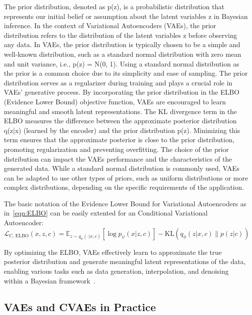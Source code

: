 The prior distribution, denoted as p(z), is a probabilistic distribution that represents our initial belief or assumption about the latent variables z in Bayesian inference. In the context of Variational Autoencoders (VAEs), the prior distribution refers to the distribution of the latent variables z before observing any data.
In VAEs, the prior distribution is typically chosen to be a simple and well-known distribution, such as a standard normal distribution with zero mean and unit variance, i.e., p(z) = N(0, 1). Using a standard normal distribution as the prior is a common choice due to its simplicity and ease of sampling.
The prior distribution serves as a regularizer during training and plays a crucial role in VAEs' generative process. By incorporating the prior distribution in the ELBO (Evidence Lower Bound) objective function, VAEs are encouraged to learn meaningful and smooth latent representations. The KL divergence term in the ELBO measures the difference between the approximate posterior distribution q(z|x) (learned by the encoder) and the prior distribution p(z). Minimizing this term ensures that the approximate posterior is close to the prior distribution, promoting regularization and preventing overfitting.
The choice of the prior distribution can impact the VAEs performance and the characteristics of the generated data. While a standard normal distribution is commonly used, VAEs can be adapted to use other types of priors, such as uniform distributions or more complex distributions, depending on the specific requirements of the application.
\fi

The basic notation of the Evidence Lower Bound for Variational Autoencoders as in~\eqref{eqn:ELBO} can be easily extented for an Conditional Variational Autoencoder:
\begin{equation}\label{eqn:ELBO-CVAE}
	\mathcal{L}_\text{C, ELBO}(x, z, c) = \mathbb{E}_{z\sim q_\phi(\cdot|x, c)} \left[ \log p_\psi(x|z, c) \right] - \text{KL}\left( q_\phi(z|x, c) \| p(z|c) \right)
\end{equation}

By optimizing the ELBO, VAEs effectively learn to approximate the true posterior distribution and generate meaningful latent representations of the data, enabling various tasks such as data generation, interpolation, and denoising within a Bayesian framework~\cite{pml2Book}.

\subsection{VAEs and CVAEs in Practice}


